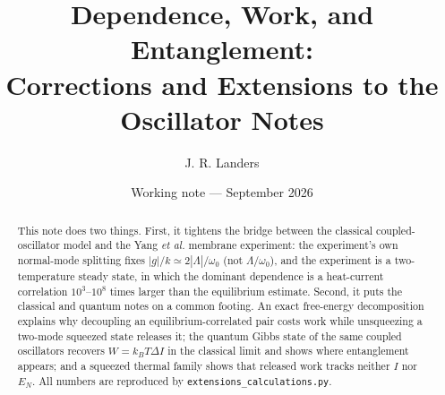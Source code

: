 \documentclass[9pt]{article}
\title{Dependence, Work, and Entanglement:\\ Corrections and Extensions to the Oscillator Notes}
\author{J. R. Landers}
\date{Working note --- September 2026}
\begin{document}
\maketitle
\vspace{-1em}
\begin{abstract}
This note does two things. First, it tightens the bridge between the classical coupled-oscillator model and the Yang \emph{et al.} membrane experiment: the experiment's own normal-mode splitting fixes $|g|/k\simeq2|\Lambda|/\omega_0$ (not $\Lambda/\omega_0$), and the experiment is a two-temperature steady state, in which the dominant dependence is a heat-current correlation $10^3$--$10^8$ times larger than the equilibrium estimate. Second, it puts the classical and quantum notes on a common footing. An exact free-energy decomposition explains why decoupling an equilibrium-correlated pair costs work while unsqueezing a two-mode squeezed state releases it; the quantum Gibbs state of the same coupled oscillators recovers $W=k_BT\Delta I$ in the classical limit and shows where entanglement appears; and a squeezed thermal family shows that released work tracks neither $I$ nor $E_N$. All numbers are reproduced by \texttt{extensions\_calculations.py}.
\end{abstract}
\end{document}
